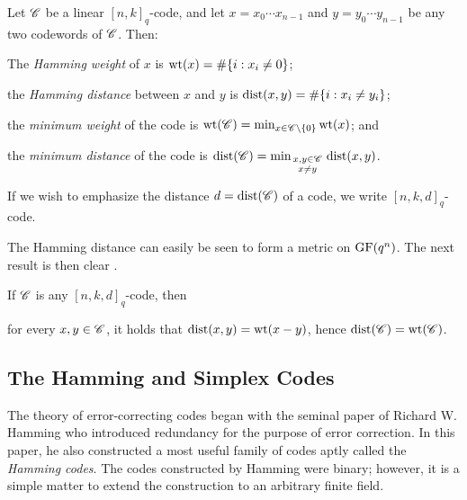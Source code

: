 \documentclass[../../../main]{subfiles}
\begin{document}
\begin{defin}\label{wt-dist}
 Let $\mathscr{C}$ be a linear $[n,k]_q$-code, and let $x=x_0 \cdots x_{n-1}$ and
 $y=y_0 \cdots y_{n-1}$ be any two codewords of $\mathscr{C}$. Then: 
 \begin{defenum}
 \item The {\it Hamming weight} of $x$ is $\text{wt}(x) = \#\{i : x_i \neq 0\}$;
 \item the {\it Hamming distance} between $x$ and $y$ is $\text{dist}(x,y) = \#\{i : x_i \neq y_i\}$;
 \item the {\it minimum weight} of the code is $\text{wt}(\mathscr{C}) = \min_{x \in
     \mathscr{C}\backslash\{0\}} \text{wt}(x)$; and
 \item the {\it minimum distance} of the code is $\text{dist}(\mathscr{C}) = \min_{\begin{smallmatrix}x,y\in\mathscr{C}\\ x \neq y\end{smallmatrix}}\text{dist}(x,y)$. 
 \end{defenum}
 If we wish to emphasize the distance $d=\text{dist}(\mathscr{C})$ of a code, we write $[n,k,d]_q$-code.
\end{defin}

The Hamming distance can easily be seen to form a metric on $\text{GF}(q^n)$. The next result is then clear \cite[see][Theorem 1.9]{hill-coding}.

\begin{prop}
 If $\mathscr{C}$ is any $[n,k,d]_q$-code, then 
 \begin{defenum}
  \item\label{wt-dist-eq} for every $x,y \in \mathscr{C}$, it holds that $\text{dist}(x,y) = \text{wt}(x-y)$, hence $\text{dist}(\mathscr{C})=\text{wt}(\mathscr{C})$.
 \end{defenum}
\end{prop}

\dinkus


\subsection{The Hamming and Simplex Codes}

The theory of error-correcting codes began with the seminal paper of Richard W. Hamming \citeyearpar{richard-hamming} who introduced redundancy for the purpose of error correction. In this paper, he also constructed a most useful family of codes aptly called the {\it Hamming codes}. The codes constructed by Hamming were binary; however, it is a simple matter to extend the construction to an arbitrary finite field.
\end{document}
